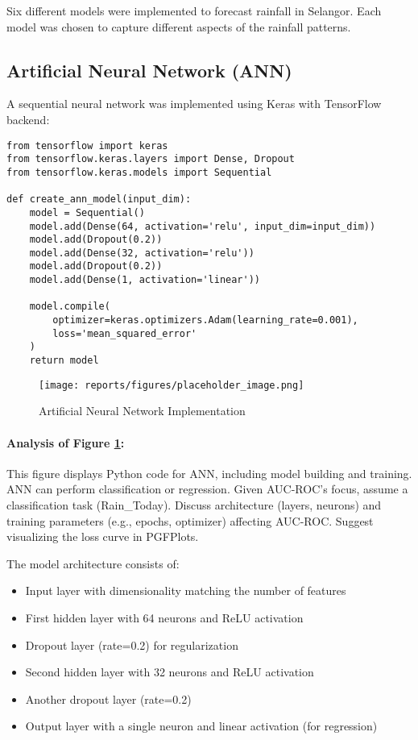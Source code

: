 \documentclass[12pt]{article}
\begin{document}
Six different models were implemented to forecast rainfall in Selangor. Each model was chosen to capture different aspects of the rainfall patterns.

\subsection{Artificial Neural Network (ANN)}
\label{subsec:ann}

A sequential neural network was implemented using Keras with TensorFlow backend:

\begin{verbatim}
from tensorflow import keras
from tensorflow.keras.layers import Dense, Dropout
from tensorflow.keras.models import Sequential

def create_ann_model(input_dim):
    model = Sequential()
    model.add(Dense(64, activation='relu', input_dim=input_dim))
    model.add(Dropout(0.2))
    model.add(Dense(32, activation='relu'))
    model.add(Dropout(0.2))
    model.add(Dense(1, activation='linear'))
    
    model.compile(
        optimizer=keras.optimizers.Adam(learning_rate=0.001),
        loss='mean_squared_error'
    )
    return model
\end{verbatim}

\begin{figure}[H]
    \centering
    \texttt{[image: reports/figures/placeholder\_image.png]} %
    \caption{Artificial Neural Network Implementation}
    \label{fig:3_7_ann_implementation}
\end{figure}

\paragraph{Analysis of Figure \ref{fig:3_7_ann_implementation}:}
This figure displays Python code for ANN, including model building and training. ANN can perform classification or regression. Given AUC-ROC’s focus, assume a classification task (Rain\_Today). Discuss architecture (layers, neurons) and training parameters (e.g., epochs, optimizer) affecting AUC-ROC. Suggest visualizing the loss curve in PGFPlots.

The model architecture consists of:
\begin{itemize}
    \item Input layer with dimensionality matching the number of features
    \item First hidden layer with 64 neurons and ReLU activation
    \item Dropout layer (rate=0.2) for regularization
    \item Second hidden layer with 32 neurons and ReLU activation
    \item Another dropout layer (rate=0.2)
    \item Output layer with a single neuron and linear activation (for regression)
\end{itemize}
\end{document}
